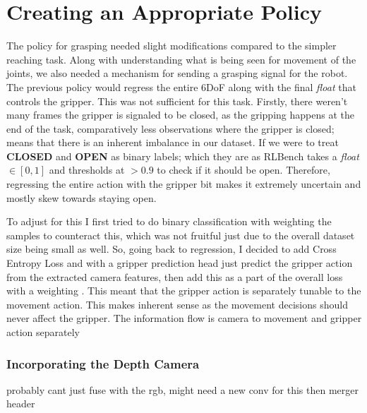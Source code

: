\section{Creating an Appropriate Policy}
The policy for grasping needed slight modifications compared to the simpler reaching task. Along with understanding what is being seen for movement of the joints, we also needed a mechanism for sending a grasping signal for the robot. The previous policy would regress the entire 6DoF along with the final \emph{float} that controls the gripper. This was not sufficient for this task. Firstly, there weren't many frames the gripper is signaled to be closed, as the gripping happens at the end of the task, comparatively less observations where the gripper is closed; means that there is an inherent imbalance in our dataset. If we were to treat \textbf{CLOSED} and \textbf{OPEN} as binary labels; which they are as RLBench takes a \emph{float} $\in \left[0, 1\right]$ and thresholds at $ > 0.9$ to check if it should be open. Therefore, regressing the entire action with the gripper bit makes it extremely uncertain and mostly skew towards staying open. 

To adjust for this I first tried to do binary classification with weighting the samples to counteract this, which was not fruitful just due to the overall dataset size being small as well. So, going back to regression, I decided to add Cross Entropy Loss and with a gripper prediction head just predict the gripper action from the extracted camera features, then add this as a part of the overall loss with a weighting . This meant that the gripper action is separately tunable to the movement action. This makes inherent sense as the movement decisions should never affect the gripper. The information flow is camera to movement and gripper action separately  


\subsubsection{Incorporating the Depth Camera}
probably cant just fuse with the rgb, might need a new conv for this then merger header


